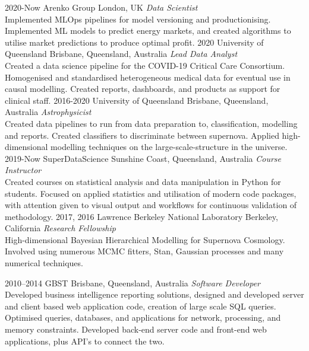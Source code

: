 \documentclass[]{friggeri-cv2}
\begin{document}
\begin{entrylist}

\entry
{2020-Now}
{Arenko Group}
{London, UK}
{\emph{Data Scientist} \\
Implemented MLOps pipelines for model versioning and productionising. Implemented ML models to predict energy markets, and created algorithms to utilise market predictions to produce optimal profit.}
\entry
{2020}
{University of Queensland}
{Brisbane, Queensland, Australia}
{\emph{Lead Data Analyst} \\
Created a data science pipeline for the COVID-19 Critical Care Consortium. Homogenised and standardised heterogeneous medical data for eventual use in causal modelling. Created reports, dashboards, and products as support for clinical staff.}
\entry
{2016-2020}
{University of Queensland}
{Brisbane, Queensland, Australia}
{\emph{Astrophysicist} \\
Created data pipelines to run from data preparation to, classification, modelling and reports. Created classifiers to discriminate between supernova. Applied high-dimensional modelling techniques on the large-scale-structure in the universe.}
\entry
{2019-Now}
{SuperDataScience}
{Sunshine Coast, Queensland, Australia}
{\emph{Course Instructor} \\
Created courses on statistical analysis and data manipulation in Python for students. Focused on applied statistics and utilisation of modern code packages, with attention given to visual output and workflows for continuous validation of methodology.}
\entry
{2017, 2016}
{Lawrence Berkeley National Laboratory}
{Berkeley, California}
{\emph{Research Fellowship} \\
High-dimensional Bayesian Hierarchical Modelling for Supernova Cosmology. Involved using numerous MCMC fitters, Stan, Gaussian processes and many numerical techniques.}



\entry
{2010--2014}
{GBST}
{Brisbane, Queensland, Australia}
{\emph{Software Developer} \\
Developed business intelligence reporting solutions, designed and developed server and client based web application code, creation of large scale SQL queries. Optimised queries, databases, and applications for network, processing, and memory constraints. Developed back-end server code and front-end web applications, plus API's to connect the two.}

\end{entrylist}
\end{document}
